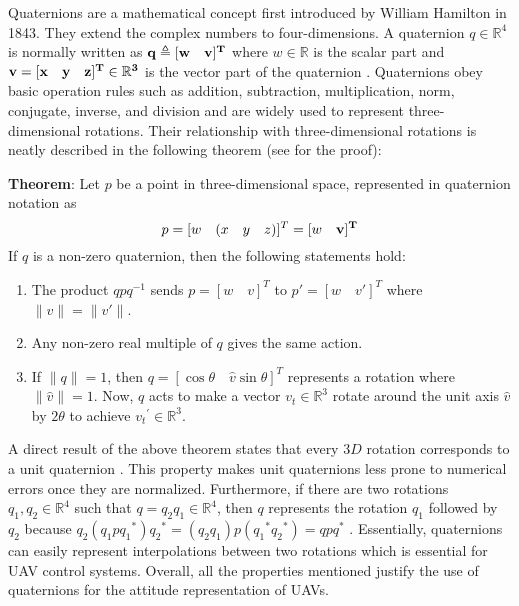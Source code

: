 \documentclass[10pt, a4paper]{article}
\begin{document}
    Quaternions are a mathematical concept first introduced by William Hamilton in 1843. They extend the complex numbers to four-dimensions. A quaternion $q \in \mathbb{R}^4$ is normally written as $\bf q \triangleq [w \quad \bf v]^T$ where $w \in \mathbb{R}$ is the scalar part and $\bf v = [x\quad y\quad z]^T \in \mathbb{R}^3$ is the vector part of the quaternion \cite{book:quan2017-quaternions}. Quaternions obey basic operation rules such as addition, subtraction, multiplication, norm, conjugate, inverse, and division and are widely used to represent three-dimensional rotations. Their relationship with three-dimensional rotations is neatly described in the following theorem (see \cite{book:quan2017-quaternions} for the proof):
    
    \noindent \textbf{Theorem}: Let $p$ be a point in three-dimensional space, represented in quaternion notation as $$p = [w \quad (x\quad y\quad z)]^T = [w \quad \bf v]^T$$ If $q$ is a non-zero quaternion, then the following statements hold:
    \begin{enumerate}
        \item The product $qpq^{-1}$ sends $p=[w\quad v]^T$ to $p'=[w\quad v']^T$ where $\lVert v\rVert = \lVert v'\rVert$.
        \item Any non-zero real multiple of $q$ gives the same action.
        \item If $\lVert q \rVert = 1$, then $q=[\cos \theta \quad \hat{v} \sin \theta]^T$ represents a rotation where $\lVert\hat{v}\rVert=1$. Now, $q$ acts to make a vector $v_t \in \mathbb{R}^3$ rotate around the unit axis $\hat{v}$ by $2\theta$ to achieve ${v_t}^{'} \in \mathbb{R}^3$.
    \end{enumerate}

    A direct result of the above theorem states that every $3D$ rotation corresponds to a unit quaternion \cite{book:quan2017-quaternions}. This property makes unit quaternions less prone to numerical errors once they are normalized. Furthermore, if there are two rotations $q_1, q_2 \in \mathbb{R}^4$ such that $q=q_2 q_1 \in \mathbb{R}^4$, then $q$ represents the rotation $q_1$ followed by $q_2$ because $q_2(q_1p{q_1}^{*}){q_2}^{*} = (q_2q_1)p({q_1}^{*}{q_2}^{*}) = qpq^{*}$ \cite{book:quan2017-quaternions}. Essentially, quaternions can easily represent interpolations between two rotations which is essential for UAV control systems. Overall, all the properties mentioned justify the use of quaternions for the attitude representation of UAVs.
\end{document}
